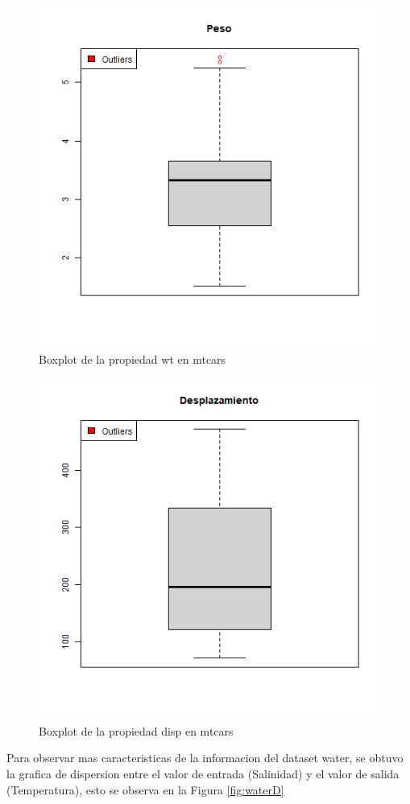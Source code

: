 \documentclass[sigconf]{acmart}
\begin{document}
	\begin{figure}
		\centering
		\includegraphics[width=0.7\linewidth]{img/wtBoxplot.png}
		\caption{Boxplot de la propiedad wt en mtcars}
		\label{fig:wtBP}
	\end{figure}
	
	\begin{figure}
		\centering
		\includegraphics[width=0.7\linewidth]{img/dispBoxplot.png}
		\caption{Boxplot de la propiedad disp en mtcars}
		\label{fig:dispBP}
	\end{figure}
	
	Para observar mas caracteristicas de la informacion del dataset water, se obtuvo la grafica de dispersion entre el valor de entrada (Salinidad) y el valor de salida (Temperatura), esto se observa en la Figura \ref{fig:waterD}
	
\end{document}
